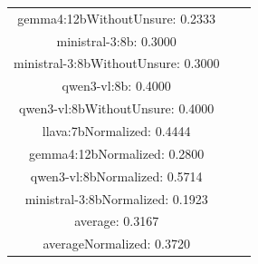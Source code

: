 \documentclass[a4paper]{article}
\begin{document}
\begin{tabular}{ccc}
gemma4:12bWithoutUnsure: 0.2333 \\ ministral-3:8b: 0.3000 \\ ministral-3:8bWithoutUnsure: 0.3000 \\ qwen3-vl:8b: 0.4000 \\ qwen3-vl:8bWithoutUnsure: 0.4000 \\ llava:7bNormalized: 0.4444 \\ gemma4:12bNormalized: 0.2800 \\ qwen3-vl:8bNormalized: 0.5714 \\ ministral-3:8bNormalized: 0.1923 \\ average: 0.3167 \\ averageNormalized: 0.3720 \end{minipage}\\
\end{tabular}

\vspace{5mm}
\end{document}
